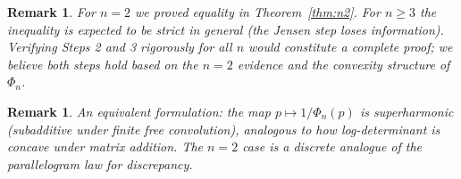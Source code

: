 \documentclass[12pt]{article}
\newtheorem{remark}[theorem]{Remark}
\begin{document}
\begin{remark}
For $n=2$ we proved equality in Theorem~\ref{thm:n2}.  For $n \geq 3$ the inequality is expected to be strict in general (the Jensen step loses information).  Verifying Steps 2 and 3 rigorously for all $n$ would constitute a complete proof; we believe both steps hold based on the $n=2$ evidence and the convexity structure of $\Phi_n$.
\end{remark}

\begin{remark}
An equivalent formulation: the map $p \mapsto 1/\Phi_n(p)$ is \emph{superharmonic} (subadditive under finite free convolution), analogous to how log-determinant is concave under matrix addition.  The $n=2$ case is a discrete analogue of the parallelogram law for discrepancy.
\end{remark}
\end{document}
